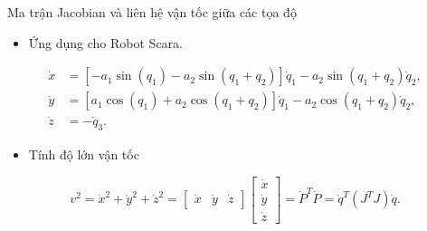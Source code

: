 \begin{frame}{Ma trận Jacobian và liên hệ vận tốc giữa các tọa độ}
    \begin{itemize}
        \item Ứng dụng cho Robot Scara.
    \end{itemize}
            \begin{align}
                \dot{x} &= \left[ -a_1 \sin \left( q_1 \right) - a_2 \sin \left( q_1 + q_2 \right) \right] \dot{q}_1 - a_2 \sin \left( q_1 + q_2 \right) \dot{q}_2, \\
                \dot{y} &= \left[ a_1 \cos \left( q_1 \right) + a_2 \cos \left( q_1 + q_2 \right) \right] \dot{q}_1 - a_2 \cos \left( q_1 + q_2 \right) \dot{q}_2, \\
                \dot{z} &= -\dot{q}_3.
            \end{align}
    \begin{itemize}
        \item Tính độ lớn vận tốc
    \end{itemize}
    \begin{equation}
        v^2 = \dot{x}^2 + \dot{y}^2 + \dot{z}^2
        = \left[ \begin{array}{ccc}
            \dot{x} & \dot{y} & \dot{z}
        \end{array} \right]
        \left[ \begin{array}{c}
            \dot{x} \\
            \dot{y} \\
            \dot{z}
        \end{array} \right]
        = \dot{P}^T \dot{P}
        = \dot{q}^T \left( J^T J \right) \dot{q}.
    \end{equation}
\end{frame}
